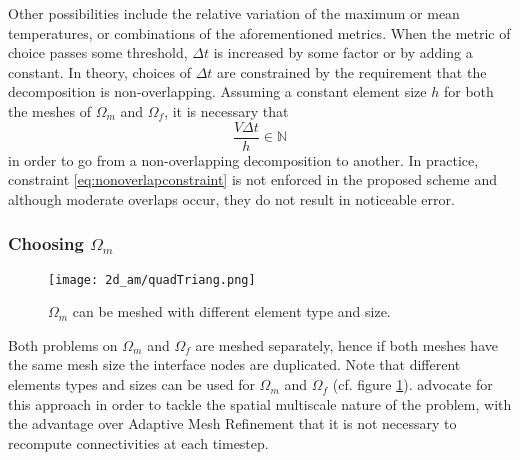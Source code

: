 Other possibilities include the relative variation
of the maximum or mean temperatures, or combinations
of the aforementioned metrics. When the metric of choice
passes some threshold, $\Delta t$ is increased
by some factor or by adding a constant. In theory,
choices of $\Delta t$ are constrained
by the requirement that the decomposition is non-overlapping.
Assuming a constant element size $h$
for both the meshes of $\Omega_m$ and $\Omega_f$,
it is necessary that
\begin{equation}\label{eq:nonoverlapconstraint}
  \frac{V \Delta t}{h} \in \mathbb{N}
\end{equation}
in order to go from a non-overlapping decomposition to another.
In practice, constraint \eqref{eq:nonoverlapconstraint} is not enforced
in the proposed scheme and although moderate overlaps occur, they do
not result in noticeable error.

\subsubsection{Choosing \texorpdfstring{$\Omega_m$}{Omega m}}

\begin{figure}[]
  \centering
  \texttt{[image: 2d\_am/quadTriang.png]}
  \caption{$\Omega_m$ can be meshed with different element type and size.}
  \label{fig:quadtriang}
\end{figure}

Both problems on $\Omega_m$ and $\Omega_f$
are meshed separately, hence if both meshes
have the same mesh size the interface nodes are duplicated.
Note that different elements types and sizes
can be used for $\Omega_m$ and $\Omega_f$ (cf. figure \ref{fig:quadtriang}).
\cite{Storti2022, carraturo2021twolevel} advocate for this approach
in order to tackle the spatial multiscale nature of
the problem, with the advantage over Adaptive Mesh Refinement
that it is not necessary to recompute connectivities at
each timestep.\par

